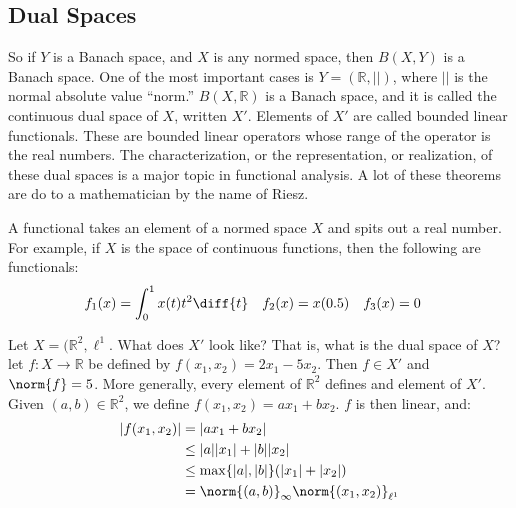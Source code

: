         \subsection{Dual Spaces}
            So if $Y$ is a Banach space, and $X$ is any normed
            space, then $B(X,Y)$ is a Banach space. One of the
            most important cases is $Y=(\mathbb{R},||)$, where
            $||$ is the normal absolute value ``norm.''
            $B(X,\mathbb{R})$ is a Banach space, and it is
            called the continuous dual space of $X$, written
            $X'$. Elements of $X'$ are called bounded linear
            functionals. These are bounded linear operators
            whose range of the operator is the real numbers.
            The characterization, or the representation, or
            realization, of these dual spaces is a major
            topic in functional analysis. A lot of these
            theorems are do to a mathematician by the name
            of Riesz.
            \begin{example}
                A functional takes an element of a normed
                space $X$ and spits out a real number. For
                example, if $X$ is the space of continuous
                functions, then the following are
                functionals:
                \begin{align*}
                    f_{1}(x)&=\int_{0}^{1}x(t)t^{2}\diff{t}
                    &
                    f_{2}(x)&=x(0.5)
                    &
                    f_{3}(x)&=0
                \end{align*}
            \end{example}
            Let $X=(\mathbb{R}^{2},\ell^{1}$. What does
            $X'$ look like? That is, what is the dual
            space of $X$? let $f:X\rightarrow\mathbb{R}$
            be defined by
            $f(x_{1},x_{2})=2x_{1}-5x_{2}$. Then
            $f\in{X'}$ and $\norm{f}=5$. More generally,
            every element of $\mathbb{R}^{2}$ defines
            and element of $X'$. Given
            $(a,b)\in\mathbb{R}^{2}$, we define
            $f(x_{1},x_{2})=ax_{1}+bx_{2}$. $f$ is then linear,
            and:
            \begin{align*}
                |f(x_{1},x_{2})|
                &=|ax_{1}+bx_{2}|\\
                &\leq|a||x_{1}|+|b||x_{2}|\\
                &\leq\max\{|a|,|b|\}(|x_{1}|+|x_{2}|)\\
                &=\norm{(a,b)}_{\infty}
                \norm{(x_{1},x_{2})}_{\ell^{1}}
            \end{align*}
